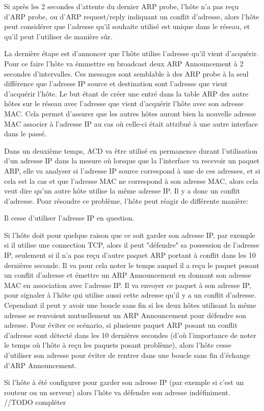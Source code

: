 Si après les 2 secondes d'attente du dernier ARP probe, l'hôte n'a pas reçu d'ARP probe,
ou d'ARP request/reply indiquant un conflit d'adresse, alors l'hôte peut considérer que
l'adresse qu'il souhaite utilisé est unique dans le réseau, et qu'il peut l'utiliser de
manière sûr.

La dernière étape est d'annoncer que l'hôte utilise l'adresse qu'il vient d'acquérir.
Pour ce faire l'hôte va émmettre en broadcast deux ARP Announcement à 2 secondes d'intervalles.
Ces messages sont semblable à des ARP probe à la seul différence que l'adresse IP source
et destination sont l'adresse que vient d'acquérir l'hôte.
Le but étant de créer une entré dans la table ARP des autre hôtes sur le réseau avec l'adresse
que vient d'acquérir l'hôte avec son adresse MAC. Cela permet d'assurer que les autres hôtes
auront bien la nouvelle adresse MAC associer à l'adresse IP au cas où celle-ci était attribué à
une autre interface dans le passé.


Dans un deuxième temps, ACD va être utilisé en permanence durant l'utilisation d'un adresse IP
dans la mesure où lorsque que la l'interface va recevoir un paquet ARP, elle va analyser
si l'adresse IP source correspond à une de ces adresses, et si cela est la cas et que l'adresse
MAC ne correspond à son adresse MAC, alors cela veut dire qu'un autre hôte utilise la même
adresse IP. Il y a donc un conflit d'adresse.
Pour résoudre ce problème, l'hôte peut réagir de différente manière:
\item Il cesse d'utiliser l'adresse IP en question.
\item Si l'hôte doit pour quelque raison que ce soit garder son adresse IP, par exemple si il
utilise une connection TCP, alors il peut "défendre" sa possession de l'adresse IP, seulement si
il n'a pas reçu d'autre paquet ARP portant à conflit dans les 10 dernières seconde.
Il va pour cela noter le temps auquel il a reçu le paquet posant un conflit d'adresse et émettre un ARP Announcement en donnant son adresse MAC en association avec
l'adresse IP. Il va envoyer ce paquet à son adresse IP, pour signaler à l'hôte qui utilise
aussi cette adresse qu'il y a un conflit d'adresse. Cependant il peut y avoir une boucle sans
fin si les deux hôtes utilisant la même adresse se renvoient mutuellement un ARP Announcement
pour défendre son adresse. Pour éviter ce scénario, si plusieurs paquet ARP posant un conflit
d'adresse sont détecté dans les 10 dernières secondes (d'où l'importance de noter le temps où l'hôte à reçu les paquets posant problème), alors l'hôte cesse d'utiliser son adresse
pour éviter de rentrer dans une boucle sans fin d'échange d'ARP Announcement.
\item Si l'hôte à été configurer pour garder son adresse IP (par exemple si c'est un routeur
ou un serveur) alors l'hôte va défendre son adresse indéfiniment. //TODO compléter


